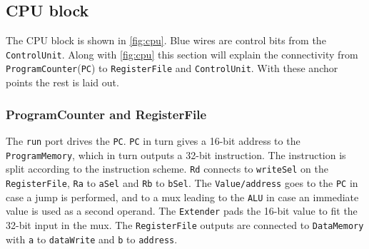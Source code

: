 \documentclass[a4paper, english]{article}
\numberwithin{equation}{section}
\begin{document}
\subsection{CPU block}\label{sec:CPU}
The CPU block is shown in \cref{fig:cpu}. Blue wires are control bits from the \texttt{ControlUnit}. Along with \cref{fig:cpu} this section will explain the connectivity from \texttt{ProgramCounter}(\texttt{PC}) to \texttt{RegisterFile} and \texttt{ControlUnit}. With these anchor points the rest is laid out.
\subsubsection{ProgramCounter and RegisterFile}
The \texttt{run} port drives the \texttt{PC}. \texttt{PC} in turn gives a 16-bit address to the \texttt{ProgramMemory}, which in turn outputs a 32-bit instruction. The instruction is split according to the instruction scheme. \texttt{Rd} connects to \texttt{writeSel} on the \texttt{RegisterFile}, \texttt{Ra} to \texttt{aSel} and \texttt{Rb} to \texttt{bSel}. The \texttt{Value/address} goes to the \texttt{PC} in case a jump is performed, and to a mux leading to the \texttt{ALU} in case an immediate value is used as a second operand. The \texttt{Extender} pads the 16-bit value to fit the 32-bit input in the mux. The \texttt{RegisterFile} outputs are connected to \texttt{DataMemory} with \texttt{a} to \texttt{dataWrite} and \texttt{b} to \texttt{address}.
\end{document}
